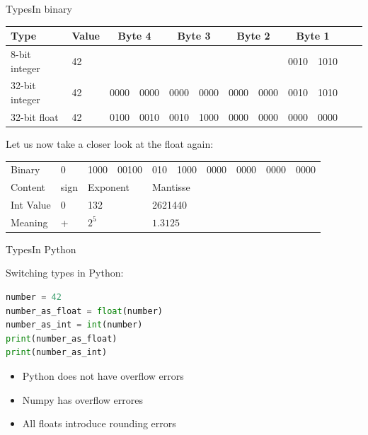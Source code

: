 \documentclass[aspectratio=169]{beamer}
\begin{document}
\begin{frame}{Types}{In binary}
\begin{tabular}{
	ll
	ll
	ll
	ll
	ll
	ll
}
	\toprule
	Type & Value
	&\multicolumn{2}{c}{Byte 4}
	&\multicolumn{2}{c}{Byte 3}
	&\multicolumn{2}{c}{Byte 2}
	&\multicolumn{2}{c}{Byte 1}\\
	\midrule
	8-bit integer & 42
	&&
	&&
	&&
	& 0010 & 1010 \\
	32-bit integer & 42
	& 0000 & 0000
	& 0000 & 0000
	& 0000 & 0000
	& 0010 & 1010 \\
	32-bit float & 42 
	& 0100 & 0010
	& 0010 & 1000
	& 0000 & 0000
	& 0000 & 0000 \\
	\bottomrule
\end{tabular}

\pause
\vspace{2em}
Let us now take a closer look at the float again:
\vspace{1em}

\begin{tabular}{
	l
	lll
	ll
	ll
	ll
}
	\toprule
	Binary
	& 0 
	& 1000 & 00100
	& 010 & 1000
	& 0000 & 0000
	& 0000 & 0000 \\
	\pause
	Content
	& sign  
	&\multicolumn{2}{l}{Exponent}
	&\multicolumn{6}{l}{Mantisse} \\
	\pause
	Int Value 
	& 0
	&\multicolumn{2}{l}{132}
	&\multicolumn{6}{l}{2621440}\\
	\pause
	Meaning
	& +
	& \multicolumn{2}{l}{\begin{math} 2^{5}\end{math}}
	& \multicolumn{6}{l}{\begin{math} 1.3125 \end{math}} \\
	\bottomrule
\end{tabular}
\end{frame}

\begin{frame}[fragile]{Types}{In Python}

Switching types in Python:

\begin{lstlisting}[language=Python, frame=single]
number = 42
number_as_float = float(number)
number_as_int = int(number)
print(number_as_float)
print(number_as_int)
\end{lstlisting}

\pause
\vspace{2em}
\begin{itemize}
	\item Python does not have overflow errors
	\item Numpy has overflow errores
	\item All floats introduce rounding errors
\end{itemize}

\end{frame}
\end{document}
